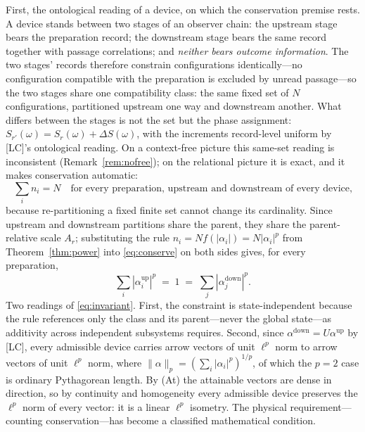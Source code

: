\documentclass[11pt]{article}
\theoremstyle{definition}
\theoremstyle{remark}
\begin{document}
First, the ontological reading of a device, on which the conservation premise rests. A device stands between two stages of an observer chain: the upstream stage bears the preparation record; the downstream stage bears the same record together with passage correlations; and \emph{neither bears outcome information}. The two stages' records therefore constrain configurations identically---no configuration compatible with the preparation is excluded by unread passage---so the two stages share one compatibility class: the same fixed set of $N$ configurations, partitioned upstream one way and downstream another. What differs between the stages is not the set but the phase assignment: $S_{r'}(\omega) = S_r(\omega) + \Delta S(\omega)$, with the increments record-level uniform by [LC]'s ontological reading. On a context-free picture this same-set reading is inconsistent (Remark~\ref{rem:nofree}); on the relational picture it is exact, and it makes conservation automatic:
\begin{equation}\label{eq:conserve}
\sum_i n_i = N \quad \text{for every preparation, upstream and downstream of every device,}
\end{equation}
because re-partitioning a fixed finite set cannot change its cardinality. Since upstream and downstream partitions share the parent, they share the parent-relative scale $A_r$; substituting the rule $n_i = N f(|\alpha_i|) = N |\alpha_i|^p$ from Theorem~\ref{thm:power} into \eqref{eq:conserve} on both sides gives, for every preparation,
\begin{equation}\label{eq:invariant}
\sum_i |\alpha_i^{\mathrm{up}}|^p \;=\; 1 \;=\; \sum_j |\alpha_j^{\mathrm{down}}|^p .
\end{equation}
Two readings of \eqref{eq:invariant}. First, the constraint is state-independent because the rule references only the class and its parent---never the global state---as additivity across independent subsystems requires. Second, since $\alpha^{\mathrm{down}} = U \alpha^{\mathrm{up}}$ by [LC], every admissible device carries arrow vectors of unit $\ell^p$ norm to arrow vectors of unit $\ell^p$ norm, where $\lVert \alpha \rVert_p = (\sum_i |\alpha_i|^p)^{1/p}$, of which the $p = 2$ case is ordinary Pythagorean length. By (At) the attainable vectors are dense in direction, so by continuity and homogeneity every admissible device preserves the $\ell^p$ norm of every vector: it is a linear $\ell^p$ isometry. The physical requirement---counting conservation---has become a classified mathematical condition.
\end{document}
